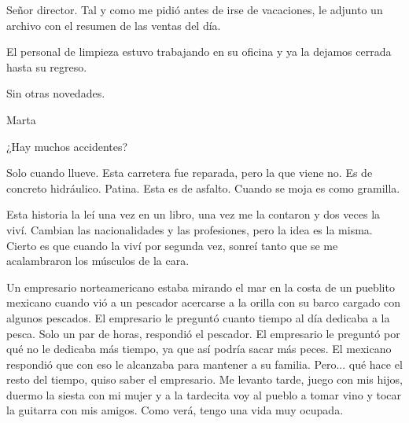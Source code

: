 \documentclass[12pt,twoside,openright,a5paper]{book}
\begin{document}
\vspace{0.5cm}

Señor director. Tal y como me pidió antes de irse de vacaciones, le
adjunto un archivo con el resumen de las ventas del día.

El personal de limpieza estuvo trabajando en su oficina y ya la dejamos
cerrada hasta su regreso.

Sin otras novedades.

\vspace{0.5cm}

Marta


\vspace{0.5cm}
\hrulefill\hspace{0.2cm} \decofourleft\decofourright \hspace{0.2cm} \hrulefill
\vspace{0.5cm}

¿Hay muchos accidentes?

Solo cuando llueve. Esta carretera fue reparada, pero la que viene no. Es
de concreto hidráulico. Patina. Esta es de asfalto. Cuando se moja es
como gramilla.


\vspace{0.5cm}
\hrulefill\hspace{0.2cm} \decofourleft\decofourright \hspace{0.2cm} \hrulefill
\vspace{0.5cm}

Esta historia la leí una vez en un libro, una vez me la contaron y dos
veces la viví. Cambian las nacionalidades y las profesiones, pero la idea
es la misma. Cierto es que cuando la viví por segunda vez, sonreí tanto
que se me acalambraron los músculos de la cara.

Un empresario norteamericano estaba mirando el mar en la costa de un
pueblito mexicano cuando vió a un pescador acercarse a la orilla con
su barco cargado con algunos pescados. El empresario le preguntó cuanto
tiempo al día dedicaba a la pesca. Solo un par de horas, respondió el
pescador. El empresario le preguntó por qué no le dedicaba más tiempo,
ya que así podría sacar más peces. El mexicano respondió que con eso
le alcanzaba para mantener a su familia. Pero... qué hace el resto del
tiempo, quiso saber el empresario. Me levanto tarde, juego con mis hijos,
duermo la siesta con mi mujer y a la tardecita voy al pueblo a tomar vino
y tocar la guitarra con mis amigos. Como verá, tengo una vida muy ocupada.
\end{document}
